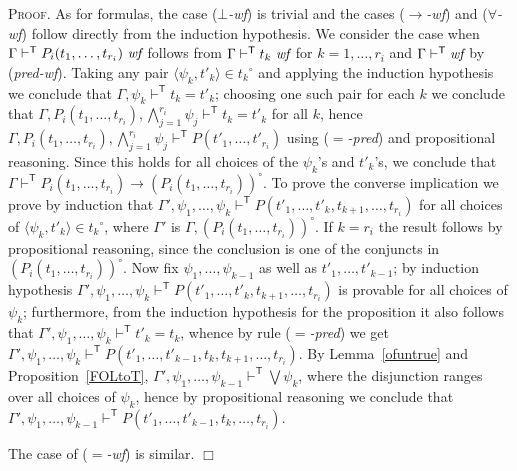 \documentclass{article}
\newenvironment{proof}{\smallskip\textsc{Proof.}}{\hspace*{\fill}$\Box$}
\newcommand{\ofun}[1]{\ensuremath{{#1}^\circ}}
\newcommand{\ok}{\mbox{\em wf}}
\newcommand{\wf}{\ \mbox{\em wf}}
\newcommand{\pair}[2]{\ensuremath{\langle{#1},{#2}\rangle}}
\newcommand{\myvdash}[1]{\ensuremath{\vdash^{\mathsf{#1}}}}
\begin{document}
\begin{proof}
As for formulas, the case (\emph{$\bot$-wf}) is trivial and the cases
(\emph{$\to$-wf}) and (\emph{$\forall$-wf}) follow directly from the
induction hypothesis.  We consider the case when
$\Gamma\myvdash{T} P_i(t_1,\ldots,t_{r_i})\wf$ follows from
$\Gamma\myvdash{T} t_k\wf$ for $k=1,\ldots,r_i$ and $\Gamma\myvdash{T}\ok$
by (\emph{pred-wf}).
Taking any pair $\pair{\psi_k}{t'_k}\in\ofun{t_k}$ and applying the
induction hypothesis we conclude that $\Gamma,\psi_k\myvdash{T} t_k=t'_k$;
choosing one such pair for each $k$ we conclude that
$\Gamma,P_i(t_1,\ldots,t_{r_i}),\bigwedge_{j=1}^{r_i}\psi_j\myvdash{T} t_k=t'_k$
for all $k$, hence 
$\Gamma,P_i(t_1,\ldots,t_{r_i}),\bigwedge_{j=1}^{r_i}\psi_j\myvdash{T}%
P(t'_1,\ldots,t'_{r_i})$ using (\emph{$=$-pred}) and propositional reasoning.
Since this holds for all choices of the $\psi_k$'s and $t'_k$'s, we conclude
that
$\Gamma\myvdash{T} P_i(t_1,\ldots,t_{r_i})\to\ofun{(P_i(t_1,\ldots,t_{r_i}))}$.
To prove the converse implication we prove by induction that
$\Gamma',\psi_1,\ldots,\psi_{k}\myvdash{T}%
P(t'_1,\ldots,t'_k,t_{k+1},\ldots,t_{r_i})$ for all choices of
$\pair{\psi_k}{t'_k}\in\ofun{t_k}$, where $\Gamma'$ is
$\Gamma,\ofun{(P_i(t_1,\ldots,t_{r_i}))}$.  If $k=r_i$ the result follows
by propositional reasoning, since the conclusion is one of the conjuncts
in {\ofun{(P_i(t_1,\ldots,t_{r_i}))}}.  Now fix $\psi_1,\ldots,\psi_{k-1}$
as well as $t'_1,\ldots,t'_{k-1}$; by induction hypothesis 
$\Gamma',\psi_1,\ldots,\psi_{k}\myvdash{T}%
P(t'_1,\ldots,t'_k,t_{k+1},\ldots,t_{r_i})$ is provable for all choices
of $\psi_k$; furthermore, from the induction hypothesis for the proposition
it also follows that $\Gamma',\psi_1,\ldots,\psi_k\myvdash{T} t'_k=t_k$,
whence by rule (\emph{$=$-pred}) we get
$\Gamma',\psi_1,\ldots,\psi_k\myvdash{T}%
P(t'_1,\ldots,t'_{k-1},t_k,t_{k+1},\ldots,t_{r_i})$.  By
Lemma~\ref{ofuntrue} and Proposition~\ref{FOLtoT},
$\Gamma',\psi_1,\ldots,\psi_{k-1}\myvdash{T}\bigvee \psi_k$, where
the disjunction ranges over all choices of $\psi_k$, hence by propositional
reasoning we conclude that $\Gamma',\psi_1,\ldots,\psi_{k-1}\myvdash{T}%
P(t'_1,\ldots,t'_{k-1},t_k,\ldots,t_{r_i})$.

The case of (\emph{$=$-wf}) is similar.
\end{proof}
\end{document}
